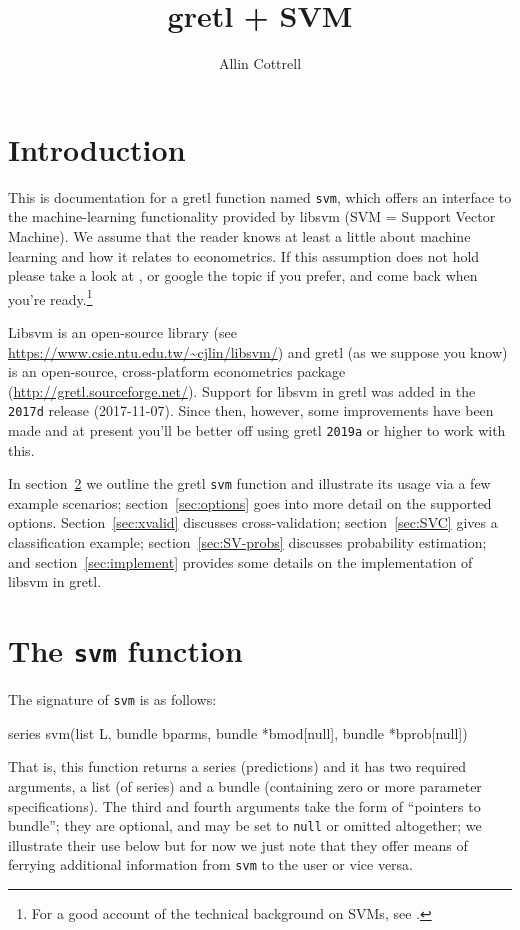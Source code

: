 \documentclass{article}
\begin{document}
\setlength{\parindent}{0pt}
\setlength{\parskip}{1ex}
\setcounter{secnumdepth}{2}

\title{gretl + SVM}
\author{Allin Cottrell}
\maketitle

\section{Introduction}
\label{sec:intro}

This is documentation for a gretl function named \texttt{svm}, which
offers an interface to the machine-learning functionality provided by
\textsf{libsvm} (SVM = Support Vector Machine). We assume that the
reader knows at least a little about machine learning and how it
relates to econometrics. If this assumption does not hold please take
a look at \cite{mull-spiess17}, or google the topic if you prefer, and
come back when you're ready.\footnote{For a good account of the
  technical background on SVMs, see \cite{smola04}.}

\textsf{Libsvm} is an open-source library (see
\url{https://www.csie.ntu.edu.tw/~cjlin/libsvm/}) and gretl (as we
suppose you know) is an open-source, cross-platform econometrics
package (\url{http://gretl.sourceforge.net/}). Support for
\textsf{libsvm} in gretl was added in the \texttt{2017d} release
(2017-11-07). Since then, however, some improvements have been made
and at present you'll be better off using gretl \texttt{2019a} or
higher to work with this.

In section~\ref{sec:function} we outline the gretl \texttt{svm}
function and illustrate its usage via a few example scenarios;
section~\ref{sec:options} goes into more detail on the supported
options. Section~\ref{sec:xvalid} discusses cross-validation;
section~\ref{sec:SVC} gives a classification example;
section~\ref{sec:SV-probs} discusses probability estimation; and
section~\ref{sec:implement} provides some details on the
implementation of \textsf{libsvm} in gretl.

\section{The \texttt{svm} function}
\label{sec:function}

The signature of \texttt{svm} is as follows:
\begin{code}
series svm(list L, bundle bparms, bundle *bmod[null], bundle *bprob[null])
\end{code}
That is, this function returns a series (predictions) and it has two
required arguments, a list (of series) and a bundle (containing zero
or more parameter specifications). The third and fourth arguments take
the form of ``pointers to bundle''; they are optional, and may be set
to \texttt{null} or omitted altogether; we illustrate their use below
but for now we just note that they offer means of ferrying additional
information from \texttt{svm} to the user or vice versa.
\end{document}
